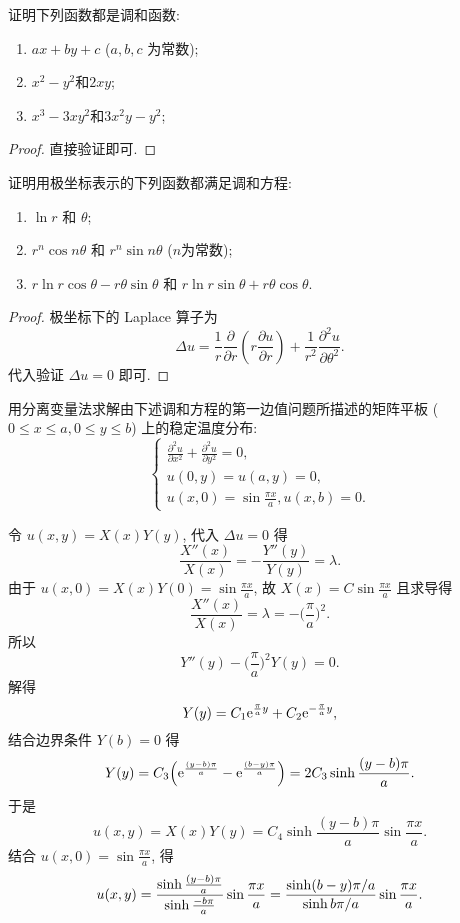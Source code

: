 \begin{exercise}
  证明下列函数都是调和函数:
  \begin{enumerate}[(1)]
    \item $ax+by+c$ ($a,b,c$ 为常数);
    \item $x^2-y^2$和$2xy$;
    \item $x^3-3xy^2$和$3x^2y-y^2$;
  \end{enumerate}
\end{exercise}

\begin{proof}
  直接验证即可.
\end{proof}



\begin{exercise}
  证明用极坐标表示的下列函数都满足调和方程:
  \begin{enumerate}[(1)]
    \item $\ln r$ 和 $\theta$;
    \item $r^n\cos n\theta$ 和 $r^n\sin n\theta$ ($n$为常数);
    \item $r\ln r\cos\theta-r\theta\sin\theta$ 和 $r\ln r\sin\theta+r\theta\cos\theta$.
  \end{enumerate}
\end{exercise}

\begin{proof}
  极坐标下的 Laplace 算子为
  \[\Delta u = \frac{1}{r}\frac{\partial}{\partial r}\left(r\frac{\partial u}{\partial r}\right)
    + \frac{1}{r^2}\frac{\partial^2u}{\partial\theta^2}.\]
  代入验证 $\Delta u=0$ 即可.
\end{proof}


\begin{exercise}
  用分离变量法求解由下述调和方程的第一边值问题所描述的矩阵平板 ($0\leq x\leq a,0\leq y\leq b$)
  上的稳定温度分布:
  \[\begin{cases}
    \frac{\partial^2u}{\partial x^2}+\frac{\partial^2u}{\partial y^2}=0,\\
    u(0,y)=u(a,y)=0,\\
    u(x,0)=\sin\frac{\pi x}{a},u(x,b)=0.
  \end{cases}\]
\end{exercise}

\begin{solve}
  令 $u(x,y)=X(x)Y(y)$, 代入 $\Delta u=0$ 得
  \[\frac{X''(x)}{X(x)} = -\frac{Y''(y)}{Y(y)} = \lambda.\]
  由于 $u(x,0) = X(x)Y(0) = \sin\frac{\pi x}{a}$, 故 $X(x) = C\sin\frac{\pi x}{a}$ 且求导得
  \[\frac{X''(x)}{X(x)} = \lambda = -\biggl(\frac{\pi}{a}\biggr)^2.\]
  所以
  \[Y''(y) - \biggl(\frac{\pi}{a}\biggr)^2 Y(y) = 0.\]
  解得
  \[Y(y) = C_1 \mathrm{e}^{\frac{\pi}{a}y} + C_2 \mathrm{e}^{-\frac{\pi}{a}y},\]
  结合边界条件 $Y(b) = 0$ 得
  \[Y(y) = C_3 \Bigl(\mathrm{e}^{\frac{(y-b)\pi}{a}} - \mathrm{e}^{\frac{(b-y)\pi}{a}}\Bigr)
    = 2C_3 \sinh\frac{(y-b)\pi}{a}.\]
  于是
  \[u(x,y) = X(x)Y(y) = C_4 \sinh\frac{(y-b)\pi}{a} \sin\frac{\pi x}{a}.\]
  结合 $u(x,0) = \sin\frac{\pi x}{a}$, 得
  \[u(x,y) = \frac{\sinh \frac{(y-b)\pi}{a}}{\sinh \frac{-b\pi}{a}} \sin\frac{\pi x}{a}
    = \frac{\sinh (b-y)\pi/a}{\sinh b\pi/a} \sin\frac{\pi x}{a}.\qedhere\]
\end{solve}


